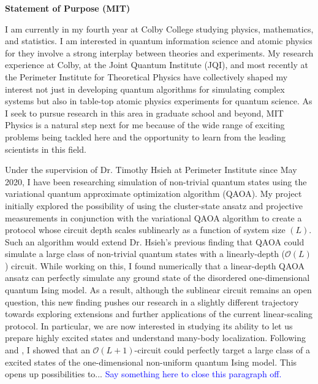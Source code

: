\documentclass[12pt]{article}
\begin{document}
	
	
\begin{center}
	\textbf{Statement of Purpose (MIT)}
\end{center}\vspace{-5pt}	
I am currently in my fourth year at Colby College studying physics, mathematics, and statistics. I am interested in quantum information science and atomic physics for they involve a strong interplay between theories and experiments. My research experience at Colby, at the Joint Quantum Institute (JQI), and most recently at the Perimeter Institute for Theoretical Physics have collectively shaped my interest not just in developing quantum algorithms for simulating complex systems but also in table-top atomic physics experiments for quantum science. As I seek to pursue research in this area in graduate school and beyond, MIT Physics is a natural step next for me because of the wide range of exciting problems being tackled here and the opportunity to learn from the leading scientists in this field.  \\ \vspace{-9pt}

Under the supervision of Dr. Timothy Hsieh at Perimeter Institute since May 2020, I have been researching simulation of non-trivial quantum states using the variational quantum approximate optimization algorithm (QAOA). My project initially explored the possibility of using the cluster-state ansatz and projective measurements in conjunction with the variational QAOA algorithm to create a protocol whose circuit depth scales sublinearly as a function of system size $(L)$. Such an algorithm would extend Dr. Hsieh's previous finding that QAOA could simulate a large class of non-trivial quantum states with a linearly-depth ($\mathcal{O}(L)$) circuit. While working on this, I found numerically that a linear-depth QAOA ansatz can perfectly simulate any ground state of the disordered one-dimensional quantum Ising model. As a result, although the sublinear circuit remains an open question, this new finding pushes our research in a slightly different trajectory towards exploring extensions and further applications of the current linear-scaling protocol. In particular, we are now interested in studying its ability to let us prepare highly excited states and understand many-body localization. Following \cite{PhysRevResearch.1.033062} and \cite{Higgott2019variationalquantum}, I showed that an $\mathcal{O}(L+1)$-circuit could perfectly target a large class of a excited states of the one-dimensional non-uniform quantum Ising model. This opens up possibilities to... \textcolor{blue}{Say something here to close this paragraph off.}\\ \vspace{-9pt}
\end{document}
